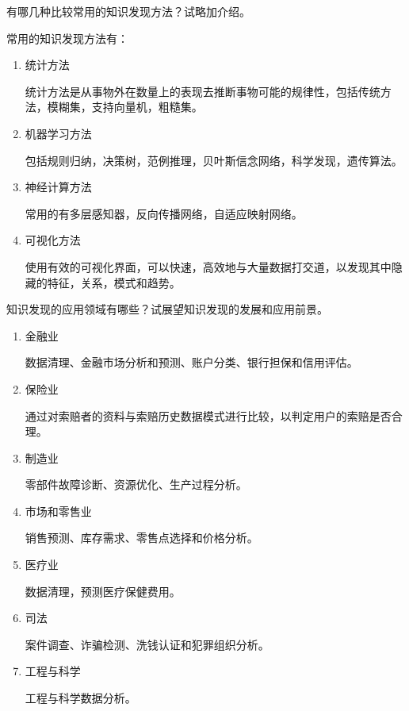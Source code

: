 \begin{question}
有哪几种比较常用的知识发现方法？试略加介绍。
\end{question}
\begin{solution}
常用的知识发现方法有：
	\begin{enumerate}
		\item 统计方法 \par
		统计方法是从事物外在数量上的表现去推断事物可能的规律性，包括传统方法，模糊集，支持向量机，粗糙集。
		\item 机器学习方法 \par
		包括规则归纳，决策树，范例推理，贝叶斯信念网络，科学发现，遗传算法。
		\item 神经计算方法 \par
		常用的有多层感知器，反向传播网络，自适应映射网络。
		\item 可视化方法 \par
		使用有效的可视化界面，可以快速，高效地与大量数据打交道，以发现其中隐藏的特征，关系，模式和趋势。
	\end{enumerate}
\end{solution}

\begin{question}
知识发现的应用领域有哪些？试展望知识发现的发展和应用前景。
\end{question}
\begin{solution}
	\begin{enumerate}
		\item 金融业 \par
		数据清理、金融市场分析和预测、账户分类、银行担保和信用评估。
		\item 保险业 \par
		通过对索赔者的资料与索赔历史数据模式进行比较，以判定用户的索赔是否合理。
		\item 制造业 \par
		零部件故障诊断、资源优化、生产过程分析。
		\item 市场和零售业 \par
		销售预测、库存需求、零售点选择和价格分析。
		\item 医疗业 \par
		数据清理，预测医疗保健费用。
		\item 司法 \par
		案件调查、诈骗检测、洗钱认证和犯罪组织分析。
		\item 工程与科学 \par
		工程与科学数据分析。
	\end{enumerate}
\end{solution}

